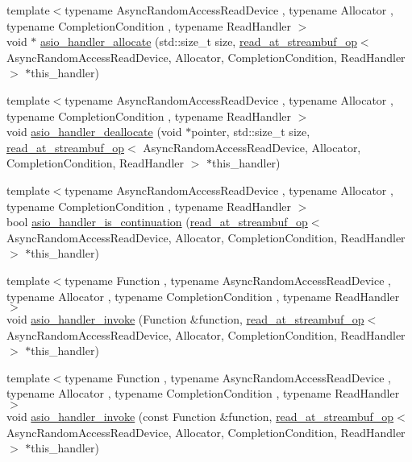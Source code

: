 \begin{DoxyCompactItemize}
\item 
{\footnotesize template$<$typename Async\+Random\+Access\+Read\+Device , typename Allocator , typename Completion\+Condition , typename Read\+Handler $>$ }\\void $\ast$ \hyperlink{namespaceasio_1_1detail_a2cc3271ccfba19466eb724b23e8fd81e}{asio\+\_\+handler\+\_\+allocate} (std\+::size\+\_\+t size, \hyperlink{classasio_1_1detail_1_1read__at__streambuf__op}{read\+\_\+at\+\_\+streambuf\+\_\+op}$<$ Async\+Random\+Access\+Read\+Device, Allocator, Completion\+Condition, Read\+Handler $>$ $\ast$this\+\_\+handler)
\item 
{\footnotesize template$<$typename Async\+Random\+Access\+Read\+Device , typename Allocator , typename Completion\+Condition , typename Read\+Handler $>$ }\\void \hyperlink{namespaceasio_1_1detail_a25d13e539a282d44e7f61b60addfc4df}{asio\+\_\+handler\+\_\+deallocate} (void $\ast$pointer, std\+::size\+\_\+t size, \hyperlink{classasio_1_1detail_1_1read__at__streambuf__op}{read\+\_\+at\+\_\+streambuf\+\_\+op}$<$ Async\+Random\+Access\+Read\+Device, Allocator, Completion\+Condition, Read\+Handler $>$ $\ast$this\+\_\+handler)
\item 
{\footnotesize template$<$typename Async\+Random\+Access\+Read\+Device , typename Allocator , typename Completion\+Condition , typename Read\+Handler $>$ }\\bool \hyperlink{namespaceasio_1_1detail_a413c93b91c6bb45a4694a1dce637ec6d}{asio\+\_\+handler\+\_\+is\+\_\+continuation} (\hyperlink{classasio_1_1detail_1_1read__at__streambuf__op}{read\+\_\+at\+\_\+streambuf\+\_\+op}$<$ Async\+Random\+Access\+Read\+Device, Allocator, Completion\+Condition, Read\+Handler $>$ $\ast$this\+\_\+handler)
\item 
{\footnotesize template$<$typename Function , typename Async\+Random\+Access\+Read\+Device , typename Allocator , typename Completion\+Condition , typename Read\+Handler $>$ }\\void \hyperlink{namespaceasio_1_1detail_aa9cb637bc0ed40f307fa784d8821d7ca}{asio\+\_\+handler\+\_\+invoke} (Function \&function, \hyperlink{classasio_1_1detail_1_1read__at__streambuf__op}{read\+\_\+at\+\_\+streambuf\+\_\+op}$<$ Async\+Random\+Access\+Read\+Device, Allocator, Completion\+Condition, Read\+Handler $>$ $\ast$this\+\_\+handler)
\item 
{\footnotesize template$<$typename Function , typename Async\+Random\+Access\+Read\+Device , typename Allocator , typename Completion\+Condition , typename Read\+Handler $>$ }\\void \hyperlink{namespaceasio_1_1detail_ae505607eeb5308317c7408a994214e9f}{asio\+\_\+handler\+\_\+invoke} (const Function \&function, \hyperlink{classasio_1_1detail_1_1read__at__streambuf__op}{read\+\_\+at\+\_\+streambuf\+\_\+op}$<$ Async\+Random\+Access\+Read\+Device, Allocator, Completion\+Condition, Read\+Handler $>$ $\ast$this\+\_\+handler)

\end{DoxyCompactItemize}
